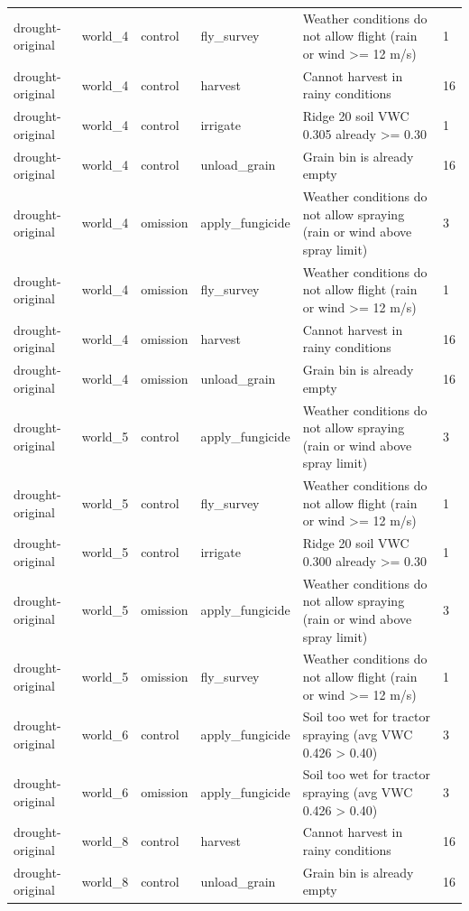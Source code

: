 {\begin{tabular}{llllll}
drought-original & world\_4 & control & fly\_survey & Weather conditions do not allow flight (rain or wind >= 12 m/s) & 1 \\
drought-original & world\_4 & control & harvest & Cannot harvest in rainy conditions & 16 \\
drought-original & world\_4 & control & irrigate & Ridge 20 soil VWC 0.305 already >= 0.30 & 1 \\
drought-original & world\_4 & control & unload\_grain & Grain bin is already empty & 16 \\
drought-original & world\_4 & omission & apply\_fungicide & Weather conditions do not allow spraying (rain or wind above spray limit) & 3 \\
drought-original & world\_4 & omission & fly\_survey & Weather conditions do not allow flight (rain or wind >= 12 m/s) & 1 \\
drought-original & world\_4 & omission & harvest & Cannot harvest in rainy conditions & 16 \\
drought-original & world\_4 & omission & unload\_grain & Grain bin is already empty & 16 \\
drought-original & world\_5 & control & apply\_fungicide & Weather conditions do not allow spraying (rain or wind above spray limit) & 3 \\
drought-original & world\_5 & control & fly\_survey & Weather conditions do not allow flight (rain or wind >= 12 m/s) & 1 \\
drought-original & world\_5 & control & irrigate & Ridge 20 soil VWC 0.300 already >= 0.30 & 1 \\
drought-original & world\_5 & omission & apply\_fungicide & Weather conditions do not allow spraying (rain or wind above spray limit) & 3 \\
drought-original & world\_5 & omission & fly\_survey & Weather conditions do not allow flight (rain or wind >= 12 m/s) & 1 \\
drought-original & world\_6 & control & apply\_fungicide & Soil too wet for tractor spraying (avg VWC 0.426 > 0.40) & 3 \\
drought-original & world\_6 & omission & apply\_fungicide & Soil too wet for tractor spraying (avg VWC 0.426 > 0.40) & 3 \\
drought-original & world\_8 & control & harvest & Cannot harvest in rainy conditions & 16 \\
drought-original & world\_8 & control & unload\_grain & Grain bin is already empty & 16 \\

\end{tabular}}
